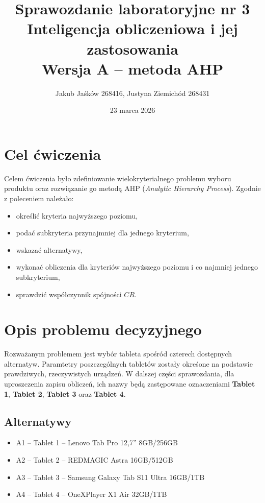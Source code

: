 \documentclass[12pt,a4paper]{article}
\title{Sprawozdanie laboratoryjne nr 3\\
\large Inteligencja obliczeniowa i jej zastosowania\\
\large Wersja A -- metoda AHP}
\author{Jakub Jaśków 268416, Justyna Ziemichód 268431}
\date{23 marca 2026}
\begin{document}
\maketitle

\section{Cel ćwiczenia}

Celem ćwiczenia było zdefiniowanie wielokryterialnego problemu wyboru produktu oraz rozwiązanie go metodą AHP (\textit{Analytic Hierarchy Process}). Zgodnie z poleceniem należało:
\begin{itemize}
    \item określić kryteria najwyższego poziomu,
    \item podać subkryteria przynajmniej dla jednego kryterium,
    \item wskazać alternatywy,
    \item wykonać obliczenia dla kryteriów najwyższego poziomu i co najmniej jednego subkryterium,
    \item sprawdzić współczynnik spójności \(CR\).
\end{itemize}

\section{Opis problemu decyzyjnego}

Rozważanym problemem jest wybór tableta spośród czterech dostępnych alternatyw. Paramtetry poszczególnych tabletów zostały okreśone na podstawie prawdziwych, rzeczywistych urządzeń. W dalszej części sprawozdania, dla uproszczenia zapisu obliczeń, ich nazwy będą zastępowane oznaczeniami \textbf{Tablet 1}, \textbf{Tablet 2}, \textbf{Tablet 3} oraz \textbf{Tablet 4}.

\subsection*{Alternatywy}
\begin{itemize}
    \item A1 -- Tablet 1 -- Lenovo Tab Pro 12{,}7'' 8GB/256GB
    \item A2 -- Tablet 2 -- REDMAGIC Astra 16GB/512GB
    \item A3 -- Tablet 3 -- Samsung Galaxy Tab S11 Ultra 16GB/1TB
    \item A4 -- Tablet 4 -- OneXPlayer X1 Air 32GB/1TB
\end{itemize}
\end{document}
